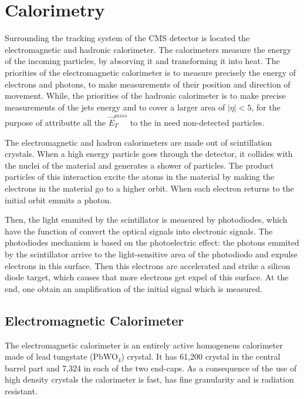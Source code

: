 
\section{Calorimetry}

Surrounding the tracking system of the CMS detector is located the electromagnetic and hadronic calorimeter. The calorimeters measure the energy of the incoming particles, by absorving it and transforming it into heat. The priorities of the electromagnetic calorimeter is to measure precisely the energy of electrons and photons, to make measurements of their position and direction of movement. While, the priorities of the hadronic calorimeter is to make precise measurements of the jets energy and to cover a larger area of $|\eta| < 5$, for the purpose of attributte all the $\vec{E}_T^{miss}$ to the in need non-detected particles. 

The electromagnetic and hadron calorimeters are made out of scintillation crystals. When a high energy particle goes through the detector, it collides with the nuclei of the material and generates a shower of particles. The product particles of this interaction excite the atoms in the material by making the electrons in the material go to a higher orbit. When each electron returns to the initial orbit emmits a photon. 

Then, the light emmited by the scintillator is measured by photodiodes, which have the function of convert the optical signals into electronic signals. The photodiodes mechanism is based on the photoelectric effect: the photons emmited by the scintillator arrive to the light-sensitive area of the photodiodo and expulse electrons in this surface. Then this electrons are accelerated and strike a silicon diode target, which causes that more electrons get expel of this surface. At the end, one obtain an amplification of the initial signal which is measured.

\subsection{Electromagnetic Calorimeter}

The electromagnetic calorimeter is an entirely active homogeneus calorimeter made of lead tungstate (PbWO$_4$) crystal. It has 61,200 crystal in the central barrel part and 7,324  in each of the two end-caps. As a consequence of the use of high density crystals the calorimeter is fast, has fine granularity and is radiation resistant. 

